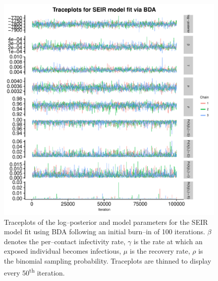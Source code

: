 \begin{figure}[htbp]
	\centering
	\includegraphics[width=0.9\linewidth]{figures/misspec_seir_bda_traceplots.pdf}
	\caption[Simulation 2 MCMC traceplots for SEIR model parameters fit using Bayesian data augmentation.]{Traceplots of the log--posterior and model parameters for the SEIR model fit using BDA following an initial burn--in of 100 iterations. $ \beta $ denotes the per--contact infectivity rate, $ \gamma $ is the rate at which an exposed individual becomes infectious, $ \mu $ is the recovery rate, $ \rho $ is the binomial sampling probability. Traceplots are thinned to display every 50\textsuperscript{th} iteration.}
	\label{fig:misspec_seir_bda_traceplots}
\end{figure}

